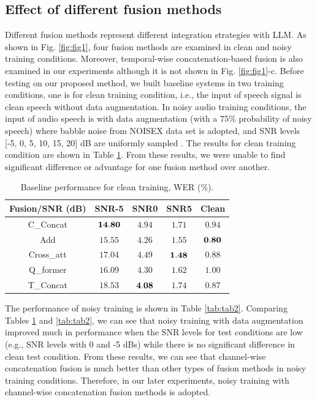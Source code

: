 \documentclass[conference]{IEEEtran}
\begin{document}
\subsection{Effect of different fusion methods}
Different fusion methods represent different integration strategies with LLM. As shown in Fig. \ref{fig:fig1}, four fusion methods are examined in clean and noisy training conditions. Moreover, temporal-wise concatenation-based fusion is also examined in our experiments although it is not shown in Fig. \ref{fig:fig1}-c. Before testing on our proposed method, we built baseline systems in two training conditions, one is for clean training condition, i.e., the input of speech signal is clean speech without data augmentation. In noisy audio training conditions, the input of audio speech is with data augmentation (with a 75\% probability of noisy speech) where babble noise from NOISEX data set is adopted, and SNR levels [-5, 0, 5, 10, 15, 20] dB are uniformly sampled \cite{MMSLLAMA2025}. The results for clean training condition are shown in Table \ref{tab:tab1}. From these results, we were unable to find significant difference or advantage for one fusion method over another. 
\begin{table}[tbh]
	\centering
	\caption{Baseline performance for clean training, WER (\%).}
	\begin{tabular}{|c||c||c||c||c|}
		\hline
		Fusion/SNR (dB) &SNR-5 & SNR0 & SNR5 & Clean \\	
		\hline	
		\hline		
		C\_Concat  & ${\bf 14.80}$ & $4.94$ & $1.71$ & $0.94$ \\		
		\hline	
		Add  & $15.55$ & ${4.26}$ & $1.55$ & ${\bf 0.80}$ \\						
		\hline
		Cross\_att & $17.04$ & $4.49$ & ${\bf 1.48}$ & $0.88$ \\
		\hline
		Q\_former & $16.09$ & $4.30$ & $1.62$ & $1.00$ \\
		\hline		
		\hline	
		T\_Concat & $18.53$ & $\bf 4.08$ & $1.74$ &$ 0.87$ \\
		\hline							
	\end{tabular}
	\label{tab:tab1}
\end{table}
The performance of noisy training is shown in Table \ref{tab:tab2}. Comparing Tables \ref{tab:tab1} and \ref{tab:tab2}, we can see that noisy training with data augmentation improved much in performance when the SNR levels for test conditions are low (e.g., SNR levels with 0 and -5 dBs) while there is no significant difference in clean test condition. From these results, we can see that channel-wise concatenation fusion is much better than other types of fusion methods in noisy training conditions. Therefore, in our later experiments, noisy training with channel-wise concatenation fusion methods is adopted.
\end{document}
